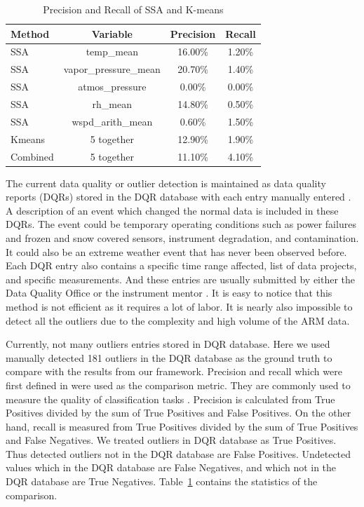\documentclass[letterpaper, 10 pt, conference]{ieeeconf}  %
\begin{document}
\begin{table}[ht]
\caption{Precision and Recall of SSA and K-means}
\label{tab:pr}
\centering
\begin{tabular}{|l|c|c|c|}
\hline
Method & Variable & Precision & Recall\\
\hline
SSA & temp\_mean & 16.00\% & 1.20\%\\
SSA & vapor\_pressure\_mean & 20.70\% & 1.40\%\\
SSA & atmos\_pressure & 0.00\% & 0.00\%\\
SSA & rh\_mean & 14.80\% & 0.50\%\\
SSA & wspd\_arith\_mean & 0.60\% & 1.50\%\\
Kmeans & 5 together & 12.90\% & 1.90\%\\
Combined & 5 together & 11.10\% & 4.10\%\\
\hline
\end{tabular}
\end{table}

The current data quality or outlier detection is maintained as data quality reports (DQRs) stored in the DQR database with each entry manually entered \cite{mccord2016arm}. A description of an event which changed the normal data is included in these DQRs. The event could be temporary operating conditions such as power failures and frozen and snow covered sensors, instrument degradation, and contamination. It could also be an extreme weather event that has never been observed before. Each DQR entry also contains a specific time range affected, list of data projects, and specific measurements. And these entries are usually submitted by either the Data Quality Office \cite{peppler2016arm} or the instrument mentor \cite{cress2016deploying}. It is easy to notice that this method is not efficient as it requires a lot of labor. It is nearly also impossible to detect all the outliers due to the complexity and high volume of the ARM data.

Currently, not many outliers entries stored in DQR database. Here we used manually detected 181 outliers in the DQR database as the ground truth to compare with the results from our framework. Precision and recall which were first defined in \cite{perry1955machine} were used as the comparison metric. They are commonly used to measure the quality of classification tasks \cite{olson2008advanced}. Precision is calculated from True Positives divided by the sum of True Positives and False Positives. On the other hand, recall is measured from True Positives divided by the sum of True Positives and False Negatives. We treated outliers in DQR database as True Positives. Thus detected outliers not in the DQR database are False Positives. Undetected values which in the DQR database are False Negatives, and which not in the DQR database are True Negatives. Table~\ref{tab:pr} contains the statistics of the comparison.
\end{document}
